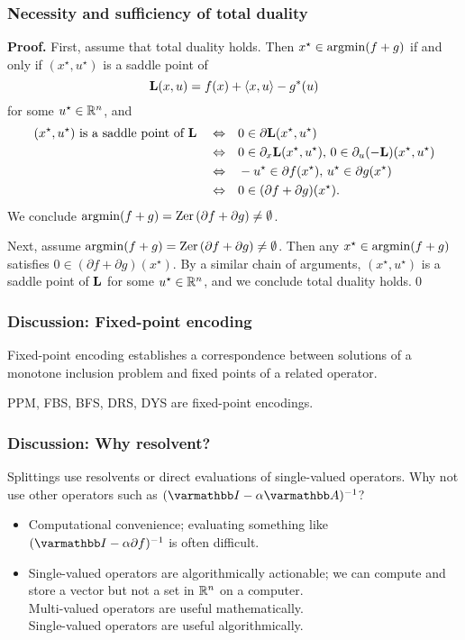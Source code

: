 \documentclass[10pt,mathserif]{beamer}
\begin{document}
\begin{frame}[plain]
\frametitle{Necessity and sufficiency of total duality}
\textbf{Proof.}
First, assume that total duality holds.
Then $x^\star\in \operatorname*{argmin}(f+g)$ if and only if $(x^\star,u^\star)$ is a saddle point of
\[
\mathbf{L}(x,u)=f(x)+\langle x,u\rangle-g^*(u)
\]
for some $u^\star\in \mathbb{R}^n$,
and
\begin{align*}
(x^\star,u^\star)\text{ is a saddle point of $\mathbf{L}$}
\quad\Leftrightarrow\quad&
0\in \partial \mathbf{L}(x^\star,u^\star)\\
\quad\Leftrightarrow\quad&
0\in \partial_x\mathbf{L}(x^\star,u^\star),\,
0\in \partial_u(-\mathbf{L})(x^\star,u^\star)\\
\quad\Leftrightarrow\quad&
-u^\star\in \partial f(x^\star),\,
u^\star\in \partial g(x^\star)\\
\quad\Leftrightarrow\quad&
0\in(\partial f+\partial g)(x^\star).
\end{align*}
We conclude
$\operatorname*{argmin}(f+g)=\mathrm{Zer}\,(\partial f+\partial g)\ne \emptyset$.

\vspace{0.2in}

Next, assume $ \operatorname*{argmin}(f+g)=\mathrm{Zer}\,(\partial f+\partial g)\ne \emptyset$.
Then any $x^\star\in \operatorname*{argmin}(f+g)$ satisfies $0\in(\partial f+\partial g)(x^\star)$.
By a similar chain of arguments, $(x^\star,u^\star)$ is a saddle point of $\mathbf{L}$
for some $u^\star\in \mathbb{R}^n$, and we conclude total duality holds.\qed
\end{frame}



\begin{frame}
\frametitle{Discussion: Fixed-point encoding}
Fixed-point encoding establishes a correspondence between solutions of a monotone inclusion problem and fixed points of a related operator.

\vspace{0.2in}
PPM, FBS, BFS, DRS, DYS are fixed-point encodings.

\end{frame}


\begin{frame}
\frametitle{Discussion: Why resolvent?}
Splittings use resolvents or direct evaluations of single-valued operators.
Why not use other operators such as $(\opI - \alpha \opA)^{-1}$?

\begin{itemize}
\item
Computational convenience; evaluating something like $(\opI - \alpha \partial f)^{-1}$ is often difficult.
\item
Single-valued operators are algorithmically actionable; we can compute and store a vector but not a set in $\mathbb{R}^n$ on a computer.\\
Multi-valued operators are useful mathematically.\\
Single-valued operators are useful algorithmically.
\end{itemize}
\end{frame}
\end{document}
